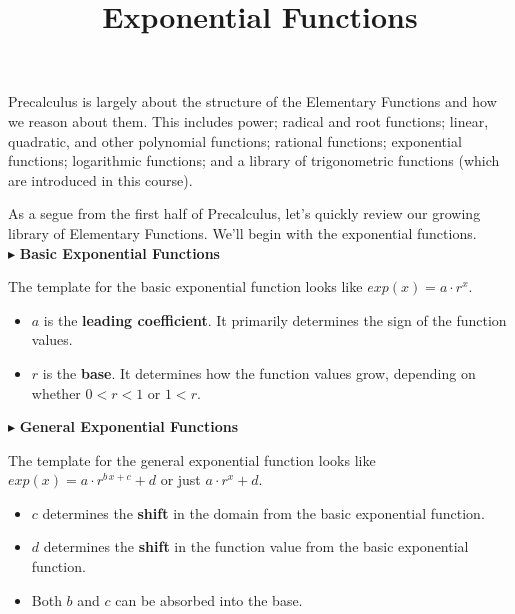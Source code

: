 \documentclass{ximera}
\title{Exponential Functions}
\begin{document}
\begin{abstract}
\end{abstract}
\maketitle




Precalculus is largely about the structure of the Elementary Functions and how we reason about them.  This includes power; radical and root functions; linear, quadratic, and other polynomial functions; rational functions; exponential functions; logarithmic functions; and a library of trigonometric functions (which are introduced in this course).

As a segue from the first half of Precalculus, let's quickly review our growing library of Elementary Functions. We'll begin with the exponential functions.   \\





$\blacktriangleright$ \textbf{\textcolor{blue!55!black}{Basic Exponential Functions}} 


The template for the basic exponential function looks like \textbf{\textcolor{blue!55!black}{$exp(x) = a \cdot r^x$}}. 

\begin{itemize}
\item $a$ is the \textbf{\textcolor{purple!85!blue}{leading coefficient}}.  It primarily determines the sign of the function values.
\item $r$ is the \textbf{\textcolor{purple!85!blue}{base}}. It determines how the function values grow, depending on whether $0 < r < 1$ or $1 < r$.
\end{itemize}





$\blacktriangleright$ \textbf{\textcolor{blue!55!black}{General Exponential Functions}}   

The template for the general exponential function looks like \textbf{\textcolor{blue!55!black}{$exp(x) = a \cdot r^{b \, x + c} + d$}}  or just \textbf{\textcolor{blue!55!black}{$a \cdot r^x + d$}}. 

\begin{itemize}
\item $c$ determines the \textbf{\textcolor{purple!85!blue}{shift}} in the domain from the basic exponential function.  
\item $d$ determines the \textbf{\textcolor{purple!85!blue}{shift}} in the function value from the basic exponential function. 
\item Both $b$ and $c$ can be absorbed into the base.
\end{itemize}
\end{document}
